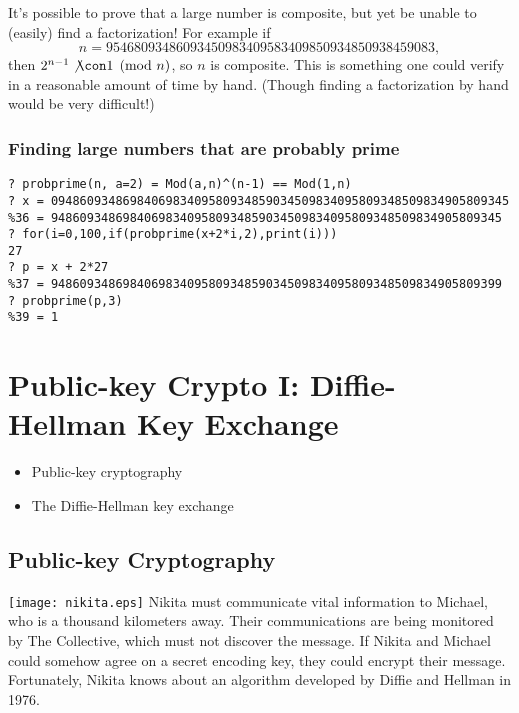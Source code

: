 \documentclass[11pt]{report}
\begin{document}
It's possible to prove that a large number is composite, but yet
be unable to (easily) find a factorization!
For example if
$$n = 95468093486093450983409583409850934850938459083,$$
then $2^{n-1}\not\con 1\pmod{n}$, so $n$ is composite.
This is something one could verify in a reasonable amount
of time by hand.  (Though finding a factorization by hand
would be very difficult!)

\subsection{Finding large numbers that are probably prime}
\begin{verbatim}
? probprime(n, a=2) = Mod(a,n)^(n-1) == Mod(1,n)
? x = 0948609348698406983409580934859034509834095809348509834905809345
%36 = 948609348698406983409580934859034509834095809348509834905809345
? for(i=0,100,if(probprime(x+2*i,2),print(i)))
27
? p = x + 2*27
%37 = 948609348698406983409580934859034509834095809348509834905809399
? probprime(p,3)
%39 = 1
\end{verbatim}








\chapter{Public-key Crypto I: Diffie-Hellman Key Exchange}

\begin{itemize}
  \item Public-key cryptography
  \item The Diffie-Hellman key exchange
\end{itemize}

\section{Public-key Cryptography}
\texttt{[image: nikita.eps]}
Nikita must communicate vital information to Michael, who is a thousand
kilometers away.  Their communications are being monitored by
The Collective, which must not discover the message.
If Nikita and Michael could somehow agree on a secret encoding
key, they could encrypt their message.  Fortunately, Nikita knows
about an algorithm developed by Diffie and Hellman in 1976.
\end{document}
